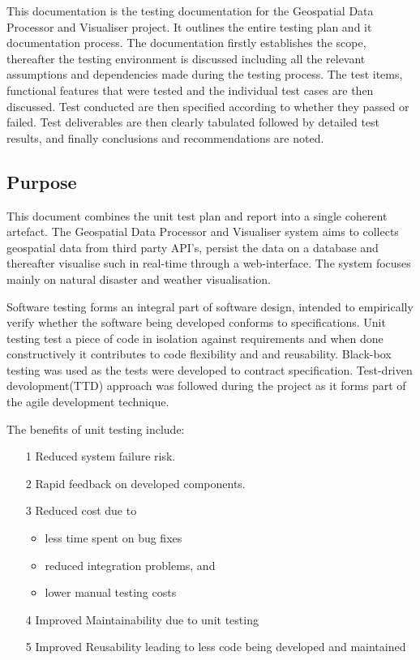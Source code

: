 This documentation is the testing documentation for the Geospatial Data Processor and Visualiser project. It outlines the entire testing plan and it documentation process. The documentation firstly establishes the scope, thereafter the testing environment is discussed including all the relevant assumptions and dependencies made during the testing process. The test items, functional features that were tested and the individual test cases are then discussed. Test conducted are then specified according to whether they passed or failed. Test deliverables are then clearly tabulated followed by detailed test results, and finally conclusions and recommendations are noted.

\subsection{Purpose}

This document combines the unit test plan and report into a single coherent artefact. The Geospatial Data Processor and Visualiser system aims to collects geospatial data from third party API's, persist the data on a database and thereafter visualise such in real-time through a web-interface. The system focuses mainly on natural disaster and weather visualisation. 


Software testing forms an integral part of software design, intended to empirically verify whether the software being developed conforms to specifications. Unit testing test a piece of code in isolation against requirements and when done constructively it contributes to code flexibility and and reusability. Black-box testing was used as the tests were developed to contract specification. Test-driven devolopment(TTD) approach was followed during the project as it forms part of the agile development technique.

The benefits of unit testing include:
\begin{enumerate}
	\item[1]Reduced system failure risk.
	
	\item[2]Rapid feedback on developed components.
	
	\item[3]Reduced cost due to
	\begin{itemize}
		\item less time spent on bug fixes
		\item reduced integration problems, and 
		\item lower manual testing costs
	\end{itemize}
	
	\item[4]Improved Maintainability due to unit testing
	
	\item[5]Improved Reusability leading to less code being developed and maintained
\end{enumerate}

